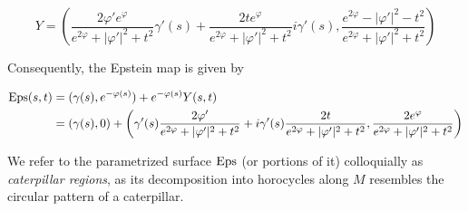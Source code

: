 \documentclass[12pt]{amsart}
\newcommand{\Eps}{{\rm Eps}}
\begin{document}
\begin{equation}
    Y = \left( \frac{2\varphi'e^{\varphi}}{e^{2\varphi}+|\varphi'|^2+t^2}\gamma'(s)+ \frac{2te^{\varphi}}{e^{2\varphi}+|\varphi'|^2+t^2}i\gamma'(s), \frac{e^{2\varphi}-|\varphi'|^2-t^2}{e^{2\varphi}+|\varphi'|^2+t^2}\right)
\end{equation}

Consequently, the Epstein map is given by

\begin{equation}\label{eq:Epsteintube}
    \begin{split}
    \Eps(s,t) &= (\gamma(s),e^{-\varphi(s)}) + e^{-\varphi(s)}Y(s,t) \\&= (\gamma(s),0) + \left( \gamma'(s)\frac{2\varphi'}{e^{2\varphi}+|\varphi'|^2+t^2}+ i\gamma'(s)\frac{2t}{e^{2\varphi}+|\varphi'|^2+t^2},  \frac{2e^{\varphi}}{e^{2\varphi}+|\varphi'|^2+t^2}\right)
    \end{split}
\end{equation}

We refer to the parametrized surface $\Eps$ (or portions of it) colloquially as \emph{caterpillar regions}, as its decomposition into horocycles along $M$ resembles the circular pattern of a caterpillar.
\end{document}
